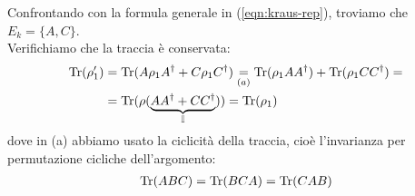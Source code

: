 \documentclass[../../InformazioneQuantistica.tex]{subfiles}
\begin{document}
Confrontando con la formula generale in (\ref{eqn:kraus-rep}), troviamo che $E_k = \{A,C\}$.\\
Verifichiamo che la traccia è conservata:
\begin{align*}
\operatorname{Tr}(\rho_1') &= \operatorname{Tr}(A\rho_1 A^\dag + C\rho_1 C^\dag) \underset{(a)}{=} \operatorname{Tr}(\rho_1 A A^\dag) + \operatorname{Tr}(\rho_1 CC^\dag) =\\
&= \operatorname{Tr}(\rho(\underbrace{AA^\dag + CC^\dag}_{\mathbb{I}})) = \operatorname{Tr}(\rho_1)
\end{align*}
dove in (a) abbiamo usato la ciclicità della traccia, cioè l'invarianza per permutazione cicliche dell'argomento:
\begin{align*}
\operatorname{Tr}(ABC)=\operatorname{Tr}(BCA) = \operatorname{Tr}(CAB)
\end{align*}

\begin{comment}
Con operazioni di questo tipo possiamo esplorare stati \q{all'interno} della sfera di Bloch, considerando quindi un'evoluzione non unitaria, dato che si perde la reversibilità. Per esempio, l'origine della sfera di Bloch corrisponde allo stato massimamente misto, e chiaramente un'evoluzione che porta dalla superficie della sfera di Bloch all'origine non può essere reversibile, dato che l'informazione del punto di partenza viene persa nel tragitto.

\section{Esercizio - parte 2}
CFR: Ex 3.22 Casati-Bonenti (pag. 180)


\end{comment}
\end{document}
